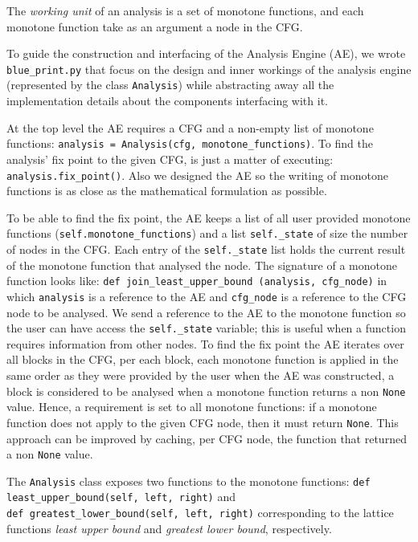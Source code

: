 The \emph{working unit} of an analysis is a set of monotone functions, and each monotone function take as an argument a node in the CFG. 

To guide the construction and interfacing of the Analysis Engine (AE), we wrote \texttt{blue\_print.py} that focus on the design and inner workings of the analysis engine (represented by the class \texttt{Analysis}) while abstracting away all the implementation details about the components interfacing with it. 

\newpar At the top level the AE requires a CFG and a non-empty list of monotone functions: \texttt{analysis = Analysis(cfg, monotone\_functions)}. To find the analysis' fix point to the given CFG, is just a matter of executing: \texttt{analysis.fix\_point()}. Also we designed the AE so the writing of monotone functions is as close as the mathematical formulation as possible.

\newpar To be able to find the fix point, the AE keeps a list of all user provided monotone functions (\texttt{self.monotone\_functions}) and a list \texttt{self.\_state} of size the number of nodes in the CFG. Each entry of the \texttt{self.\_state} list holds the current result of the monotone function that analysed the node. The signature of a monotone function looks like: \texttt{def join\_least\_upper\_bound (analysis, cfg\_node)} in which \texttt{analysis} is a reference to the AE and \texttt{cfg\_node} is a reference to the CFG node to be analysed. We send a reference to the AE to the monotone function so the user can have access the
\texttt{self.\_state} variable; this is useful when a function requires information from other nodes.
To find the fix point the AE iterates over all blocks in the CFG, per each block, each monotone function is applied in the same order as they were provided by the user when the AE was constructed, a block is considered to be analysed when a monotone function returns a non \texttt{None} value. Hence, a requirement is set to all monotone functions: if a monotone function does not apply to the given CFG node, then it must return \texttt{None}. This approach can be improved by caching, per CFG node, the function that returned a non \texttt{None} value.

\newpar The \texttt{Analysis} class exposes two functions to the monotone functions: \texttt{def least\_upper\_bound(self, left, right)} and \\\texttt{def greatest\_lower\_bound(self, left, right)} corresponding to the lattice functions \emph{least upper bound} and \emph{greatest lower bound}, respectively.

